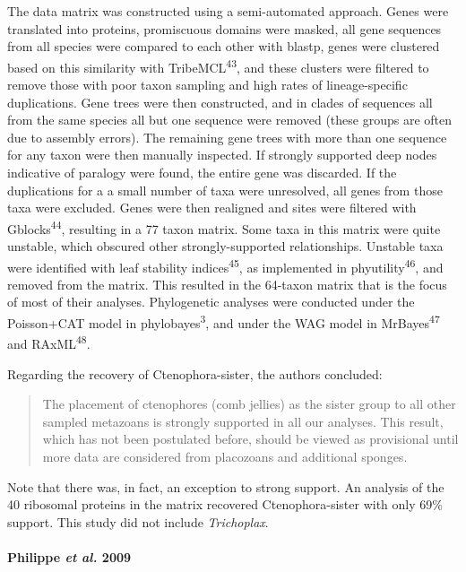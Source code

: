 \documentclass[]{article}
\let\oldparagraph\paragraph
\renewcommand{\paragraph}[1]{\oldparagraph{#1}\mbox{}}
\begin{document}
The data matrix was constructed using a semi-automated approach. Genes
were translated into proteins, promiscuous domains were masked, all gene
sequences from all species were compared to each other with blastp,
genes were clustered based on this similarity with
TribeMCL\textsuperscript{43}, and these clusters were filtered to remove
those with poor taxon sampling and high rates of lineage-specific
duplications. Gene trees were then constructed, and in clades of
sequences all from the same species all but one sequence were removed
(these groups are often due to assembly errors). The remaining gene
trees with more than one sequence for any taxon were then manually
inspected. If strongly supported deep nodes indicative of paralogy were
found, the entire gene was discarded. If the duplications for a a small
number of taxa were unresolved, all genes from those taxa were excluded.
Genes were then realigned and sites were filtered with
Gblocks\textsuperscript{44}, resulting in a 77 taxon matrix. Some taxa
in this matrix were quite unstable, which obscured other
strongly-supported relationships. Unstable taxa were identified with
leaf stability indices\textsuperscript{45}, as implemented in
phyutility\textsuperscript{46}, and removed from the matrix. This
resulted in the 64-taxon matrix that is the focus of most of their
analyses. Phylogenetic analyses were conducted under the Poisson+CAT
model in phylobayes\textsuperscript{3}, and under the WAG model in
MrBayes\textsuperscript{47} and RAxML\textsuperscript{48}.

Regarding the recovery of Ctenophora-sister, the authors concluded:

\begin{quote}
The placement of ctenophores (comb jellies) as the sister group to all
other sampled metazoans is strongly supported in all our analyses. This
result, which has not been postulated before, should be viewed as
provisional until more data are considered from placozoans and
additional sponges.
\end{quote}

Note that there was, in fact, an exception to strong support. An
analysis of the 40 ribosomal proteins in the matrix recovered
Ctenophora-sister with only 69\% support. This study did not include
\emph{Trichoplax}.

\hypertarget{philippe-et-al.-2009}{%
\paragraph{\texorpdfstring{Philippe \emph{et al.}
2009}{Philippe et al. 2009}}\label{philippe-et-al.-2009}}
\end{document}
